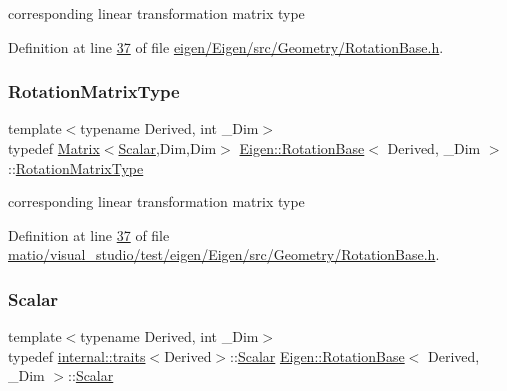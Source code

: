 corresponding linear transformation matrix type 

Definition at line \hyperlink{eigen_2_eigen_2src_2_geometry_2_rotation_base_8h_source_l00037}{37} of file \hyperlink{eigen_2_eigen_2src_2_geometry_2_rotation_base_8h_source}{eigen/\+Eigen/src/\+Geometry/\+Rotation\+Base.\+h}.

\mbox{\label{class_eigen_1_1_rotation_base_a83602509674c9d635551998460342951}} 
\subsubsection{\texorpdfstring{Rotation\+Matrix\+Type}{RotationMatrixType}\hspace{0.1cm}{\footnotesize\ttfamily [2/2]}}
{\footnotesize\ttfamily template$<$typename Derived, int \+\_\+\+Dim$>$ \\
typedef \hyperlink{group___core___module_class_eigen_1_1_matrix}{Matrix}$<$\hyperlink{class_eigen_1_1_rotation_base_af9b43eac462d7aa70b018efd49c13ef4}{Scalar},Dim,Dim$>$ \hyperlink{class_eigen_1_1_rotation_base}{Eigen\+::\+Rotation\+Base}$<$ Derived, \+\_\+\+Dim $>$\+::\hyperlink{class_eigen_1_1_rotation_base_a83602509674c9d635551998460342951}{Rotation\+Matrix\+Type}}

corresponding linear transformation matrix type 

Definition at line \hyperlink{matio_2visual__studio_2test_2eigen_2_eigen_2src_2_geometry_2_rotation_base_8h_source_l00037}{37} of file \hyperlink{matio_2visual__studio_2test_2eigen_2_eigen_2src_2_geometry_2_rotation_base_8h_source}{matio/visual\+\_\+studio/test/eigen/\+Eigen/src/\+Geometry/\+Rotation\+Base.\+h}.

\mbox{\label{class_eigen_1_1_rotation_base_af9b43eac462d7aa70b018efd49c13ef4}} 
\subsubsection{\texorpdfstring{Scalar}{Scalar}\hspace{0.1cm}{\footnotesize\ttfamily [1/2]}}
{\footnotesize\ttfamily template$<$typename Derived, int \+\_\+\+Dim$>$ \\
typedef \hyperlink{struct_eigen_1_1internal_1_1traits}{internal\+::traits}$<$Derived$>$\+::\hyperlink{class_eigen_1_1_rotation_base_af9b43eac462d7aa70b018efd49c13ef4}{Scalar} \hyperlink{class_eigen_1_1_rotation_base}{Eigen\+::\+Rotation\+Base}$<$ Derived, \+\_\+\+Dim $>$\+::\hyperlink{class_eigen_1_1_rotation_base_af9b43eac462d7aa70b018efd49c13ef4}{Scalar}}

